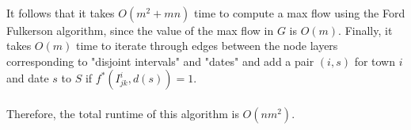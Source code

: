 \documentclass[12pt]{article}
\begin{document}
\\It follows that it takes $O(m^2 + mn)$ time to compute a max flow using the Ford Fulkerson algorithm, since the value of the max flow in $G$ is $O(m)$. Finally, it takes $O(m)$ time to iterate through edges between the node layers corresponding to "disjoint intervals" and "dates" and add a pair $(i,s)$ for town $i$ and date $s$ to $S$ if $f^*(I^i_{jk}, d(s)) = 1$.\\
\\Therefore, the total runtime of this algorithm is $O(nm^2)$.
\end{document}
